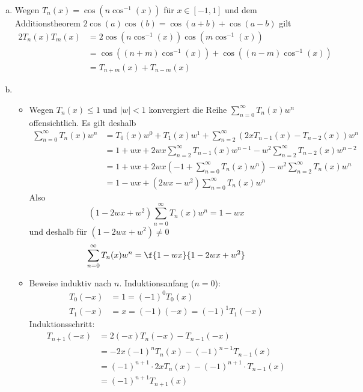 \documentclass[a4paper]{scrartcl}
\begin{document}
\begin{aufgabe}
	\begin{enumerate}[a)]
		\item		
			Wegen $T_n(x) = \cos(n\cos^{-1}(x))$ für $x\in [-1,1]$ und dem Additionstheorem $2\cos(a)\cos(b) = \cos(a+b) + \cos(a-b)$ gilt
			\begin{align*}
				2 T_n(x) T_m(x) &= 2\cos(n\cos^{-1}(x)) \cos(m\cos^{-1}(x))\\
				&=\cos((n+m)\cos^{-1}(x)) + \cos((n-m)\cos^{-1}(x))\\
				&= T_{n+m}(x) + T_{n-m}(x)
			\end{align*}
		\item
			\begin{itemize}
				\item
					Wegen $T_n(x) \le 1$ und $|w|<1$ konvergiert die Reihe $\sum_{n=0}^\infty T_n(x)w^n$ offensichtlich.
					Es gilt deshalb
					\begin{align*}
						\sum_{n=0}^\infty T_n(x)w^n
						&= T_0(x)w^0 + T_1(x)w^1 + \sum_{n=2}^\infty (2xT_{n-1}(x) - T_{n-2}(x))w^n\\
						&= 1 + wx + 2wx \sum_{n=2}^\infty T_{n-1}(x)w^{n-1} - w^2 \sum_{n=2}^\infty T_{n-2}(x) w^{n-2}\\
						&= 1 + wx + 2wx\left( - 1 + \sum_{n=0}^\infty T_n(x)w^n\right) - w^2 \sum_{n=2}^\infty T_n(x)w^n\\
						&= 1 - wx + (2wx - w^2) \sum_{n=0}^\infty T_n(x) w^n
					\end{align*}
					Also
					\[
						(1-2wx +w^2)\sum_{n=0}^\infty T_n(x)w^n = 1-wx
					\]
					und deshalb für $(1-2wx+w^2)\neq 0$
					\[
						\sum_{n=0}^\infty T_n(x) w^n = \f {1-wx}{1-2wx +w^2}
					\]
				\item
					Beweise induktiv nach $n$.
					Induktionsanfang ($n=0$):
					\begin{align*}
						T_0(-x) &= 1 = (-1)^0T_0(x)\\
						T_1(-x) &= x = (-1)(-x) = (-1)^1T_1(-x)
					\end{align*}
					Induktionsschritt:
					\begin{align*}
						T_{n+1}(-x) &= 2(-x)T_{n}(-x) - T_{n-1}(-x) \\
						&= -2x(-1)^nT_n(x) - (-1)^{n-1}T_{n-1}(x) \\
						&= (-1)^{n+1}\cdot 2xT_n(x) - (-1)^{n+1}\cdot T_{n-1}(x) \\
						&= (-1)^{n+1}T_{n+1}(x)
					\end{align*}
			\end{itemize}
	\end{enumerate}
\end{aufgabe}
\end{document}
